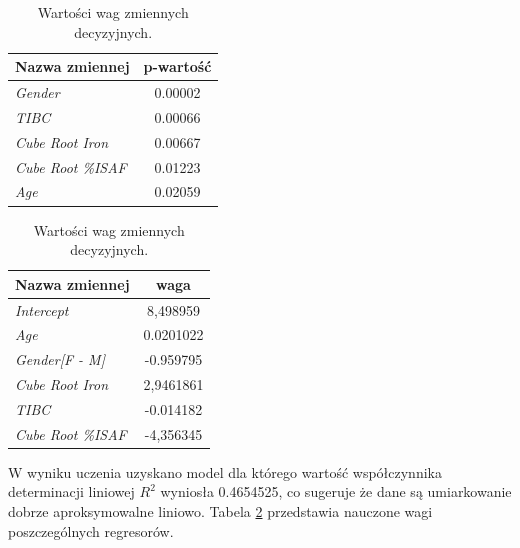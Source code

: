\begin{table}[!ht]
	\begin{minipage}{0.48\textwidth}
		\centering
		\begin{tabular}{l|c}
			Nazwa zmiennej & p-wartość \\
			\hline
			\textit{Gender} & 0.00002 \\
			\textit{TIBC} & 0.00066 \\
			\textit{Cube Root Iron} & 0.00667 \\
			\textit{Cube Root \%ISAF} & 0.01223 \\
			\textit{Age} & 0.02059
		\end{tabular}
		\caption{Wybrane zmienne decyzyjne i ich p-wartości.}
		\label{pvalue}
	\end{minipage}%
	\hspace{0.04\textwidth}
	\begin{minipage}{0.48\textwidth}
		\centering
		\begin{tabular}{l|c}
			Nazwa zmiennej & waga \\
			\hline
			\textit{Intercept} & 8,498959 \\
			\textit{Age} & 0.0201022 \\
			\textit{Gender[F - M]} & -0.959795 \\
			\textit{Cube Root Iron} & 2,9461861 \\
			\textit{TIBC} & -0.014182 \\
			\textit{Cube Root \%ISAF} & -4,356345
		\end{tabular}
		\caption{Wartości wag zmiennych decyzyjnych.}
		\label{weights}		
	\end{minipage}
\end{table}

W wyniku uczenia uzyskano model dla którego wartość współczynnika determinacji liniowej \textit{$R^2$} wyniosła 0.4654525, co sugeruje że dane są umiarkowanie dobrze aproksymowalne liniowo. Tabela \ref{weights} przedstawia nauczone wagi poszczególnych regresorów.